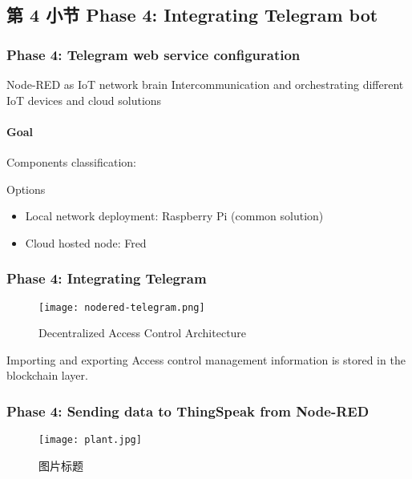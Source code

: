\documentclass[
    aspectratio=169,                   %
]{beamer}
\begin{document}
\subsection{第 4 小节 Phase 4: Integrating Telegram bot}

    \begin{frame}
        \frametitle{Phase 4: Telegram web service configuration}

        \begin{block}{Node-RED as IoT network brain}
            Intercommunication and orchestrating different IoT devices and cloud solutions
        \end{block}

        \paragraph{Goal} Components classification:

        \begin{block}{Options}
            \begin{itemize}
                \item \alert{Local network deployment}: Raspberry Pi (common solution)
                \item \alert{Cloud hosted node}: Fred
            \end{itemize}
        \end{block}

    \end{frame}

    \begin{frame}
     \frametitle{Phase 4: Integrating Telegram}
        \begin{figure}
            \centering
            \begin{stampbox}
                \texttt{[image: nodered-telegram.png]}
            \end{stampbox}
            \caption{Decentralized Access Control Architecture\cite{novo}}
        \end{figure}

        \begin{block}{Importing and exporting}
            Access control management information is stored in the blockchain layer.\cite{novo}
        \end{block}
    \end{frame}

    \begin{frame}
        \frametitle{Phase 4: Sending data to ThingSpeak from Node-RED}
        \begin{figure}
            \centering
            \begin{stampbox}
                \texttt{[image: plant.jpg]}
            \end{stampbox}
            \caption{图片标题\cite{viman}}
        \end{figure}
    \end{frame}
\end{document}
